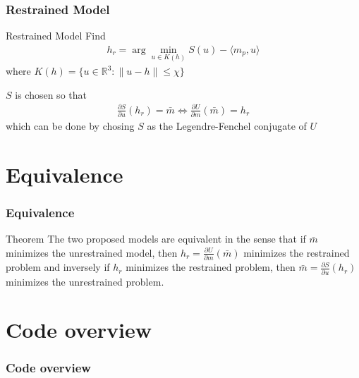 \documentclass[utf8,aspectratio=169,ngerman,english]{beamer}
\begin{document}
\begin{frame}
\frametitle{Restrained Model}
\begin{block}{Restrained Model}
Find
 \begin{align}
  h_r = \arg \min_{u \in K(h)} S(u) - \langle m_p , u \rangle
 \end{align}
where $K(h) = \{u \in \mathbb R^3: \|u - h\| \leq \chi \}$
\end{block}
$S$ is chosen so that
\begin{align}
 \frac{\partial S}{\partial u}(h_r) = \bar m \Leftrightarrow \frac{\partial U}{\partial m}(\bar m) = h_r
\end{align} which can be done by chosing $S$ as the Legendre-Fenchel conjugate of $U$


\end{frame}

\section{Equivalence}
\begin{frame}
\frametitle{Equivalence}
\begin{block}{Theorem}
 The two proposed models are equivalent in the sense that if $\bar m$ minimizes the unrestrained model, then $h_r = \frac{\partial U}{\partial m}(\bar m)$ minimizes the restrained problem and inversely if $h_r$ minimizes the restrained problem, then $\bar m = \frac{\partial S}{\partial u}(h_r)$ minimizes the unrestrained problem.
\end{block}

\end{frame}

\section{Code overview}
\begin{frame}
 \frametitle{Code overview}

\end{frame}
\end{document}
